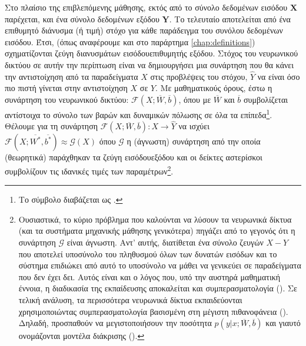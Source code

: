 Στο πλαίσιο της επιβλεπόμενης μάθησης, εκτός από το σύνολο δεδομένων εισόδου $\boldsymbol{X}$ παρέχεται, και ένα σύνολο δεδομένων εξόδου $\boldsymbol{Y}$. Το τελευταίο αποτελείται από ένα επιθυμητό διάνυσμα (ή τιμή) στόχο για κάθε παράδειγμα του συνόλου δεδομένων εισόδου. Έτσι, (όπως αναφέρουμε και στο παράρτημα \ref{chap:definitions}) σχηματίζονται ζεύγη διανυσμάτων εισόδου\textendash επιθυμητής εξόδου. Στόχος του νευρωνικού δικτύου σε αυτήν την περίπτωση είναι να δημιουργήσει μια συνάρτηση που θα κάνει την αντιστοίχηση από τα παραδείγματα $X$ στις προβλέψεις του στόχου, $\hat{Y}$ να είναι όσο πιο πιστή γίνεται στην αντιστοίχηση $X$ σε $Y$. Με μαθηματικούς όρους, έστω η συνάρτηση του νευρωνικού δικτύου: $\mathcal{F}(X;\overline{W},\overline{b})$, όπου με $\overline{W}$ και $\overline{b}$ συμβολίζεται αντίστοιχα το σύνολο των βαρών και δυναμικών πόλωσης σε όλα τα επίπεδα\footnote{Το σύμβολο \textquote{\en{;}} διαβάζεται ως .}. Θέλουμε για τη συνάρτηση $\mathcal{F}(X;\overline{W},\overline{b}):X \rightarrow \hat{Y}$ να ισχύει $\mathcal{F}(X;\overline{W^*},\overline{b^*}) \approx \mathcal{G}(X)$ όπου $\mathcal{G}$ η (άγνωστη) συνάρτηση από την οποία (θεωρητικά) παράχθηκαν τα ζεύγη εισόδου\textendash εξόδου και οι δείκτες αστερίσκοι συμβολίζουν τις ιδανικές τιμές των παραμέτρων\footnote{Ουσιαστικά, το κύριο πρόβλημα που καλούνται να λύσουν τα νευρωνικά δίκτυα (και τα συστήματα μηχανικής μάθησης γενικότερα) πηγάζει από το γεγονός ότι η συνάρτηση $\mathcal{G}$ είναι άγνωστη. Αντ' αυτής, διατίθεται ένα σύνολο ζευγών $X-Y$ που αποτελεί υποσύνολο του πληθυσμού όλων των δυνατών εισόδων και το σύστημα επιδιώκει από αυτό το υποσύνολο να μάθει να γενικεύει σε παραδείγματα που δεν έχει δει. Αυτός είναι και ο λόγος που, υπό την αυστηρά μαθηματική έννοια, η διαδικασία της εκπαίδευσης αποκαλείται και συμπερασματολογία (). Σε τελική ανάλυση, τα περισσότερα νευρωνικά δίκτυα εκπαιδεύονται χρησιμοποιώντας συμπερασματολογία βασισμένη στη μέγιστη πιθανοφάνεια ()\cite{goodfellow2016deep}. Δηλαδή, προσπαθούν να μεγιστοποιήσουν την ποσότητα $p(y|x;\overline{W},\overline{b})$ και γιαυτό ονομάζονται μοντέλα διάκρισης ().}.\par

